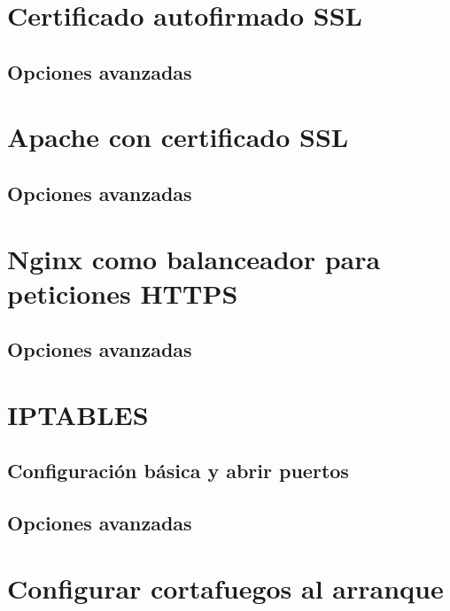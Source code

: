 
\chapter{Certificado autofirmado SSL}



\section{Opciones avanzadas}



\chapter{Apache con certificado SSL}



\section{Opciones avanzadas}



\chapter{Nginx como balanceador para peticiones HTTPS}



\section{Opciones avanzadas}



\chapter{IPTABLES}



\section{Configuración básica y abrir puertos}



\section{Opciones avanzadas}



\chapter{Configurar cortafuegos al arranque}

